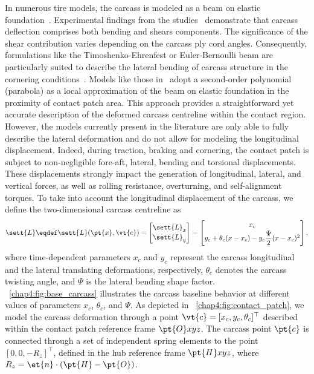 In numerous tire models, the carcass is modeled as a beam on elastic foundation~\cite{dehoogh2005implementing, sarkisov2019physical, gil2020inplane, nakajima2019advanced}. Experimental findings from the studies~\cite{sarkisov2019physical, gil2020inplane} demonstrate that carcass deflection comprises both bending and shears components. The significance of the shear contribution varies depending on the carcass ply cord angles. Consequently, formulations like the Timoshenko-Ehrenfest or Euler-Bernoulli beam are particularly suited to describe the lateral bending of carcass structure in the cornering conditions~\cite{gil2020inplane}. Models like those in~\cite{fiala1954seitenkraften, miyashita2006new, kabe2006new, xu2014analytical, gil2020inplane, sakai1981theoreticalI, sakai1981theoreticalII, sakai1981theoreticalIII, sakai1982theoreticalIV, miyashita2010tire, fevrier2013method} adopt a second-order polynomial (parabola) as a local approximation of the beam on elastic foundation in the proximity of contact patch area. This approach provides a straightforward yet accurate description of the deformed carcass centreline within the contact region. However, the models currently present in the literature are only able to fully describe the lateral deformation and do not allow for modeling the longitudinal displacement. Indeed, during traction, braking and cornering, the contact patch is subject to non-negligible fore-aft, lateral, bending and torsional displacements. These displacements strongly impact the generation of longitudinal, lateral, and vertical forces, as well as rolling resistance, overturning, and self-alignment torques. To take into account the longitudinal displacement of the carcass, we define the two-dimensional carcass centreline as
%
\begin{equation}
  \sett{L} \eqdef \sett{L}(\pt{x}, \vt{c}) =
  \begin{bmatrix}
    \sett{L}_x \\[0.2em]
    \sett{L}_y
  \end{bmatrix} =
  \begin{bmatrix}
    x_c \\[0.2em]
    y_c + \theta_c(x-x_c) - y_c\dfrac{\Psi}{2}(x-x_c)^2
  \end{bmatrix},
  \label{chap4:eq:parabola}
\end{equation}
%
where time-dependent parameters $x_c$ and $y_c$ represent the carcass longitudinal and the lateral translating deformations, respectively, $\theta_c$ denotes the carcass twisting angle, and $\Psi$ is the lateral bending shape factor. \figurename~\ref{chap4:fig:base_carcass} illustrates the carcass baseline behavior at different values of parameters $x_c$, $\theta_c$, and $\Psi$. As depicted in \figurename~\ref{chap4:fig:contact_patch}, we model the carcass deformation through a point $\vt{c} = [x_c, y_c, \theta_c]^\top$ described within the contact patch reference frame $\pt{O}xyz$. The carcass point $\pt{c}$ is connected through a set of independent spring elements to the point $\left[0, 0, -R_z\right]^\top$, defined in the hub reference frame $\pt{H}xyz$, where $R_z = \et{n} \cdot (\pt{H}-\pt{O})$.

